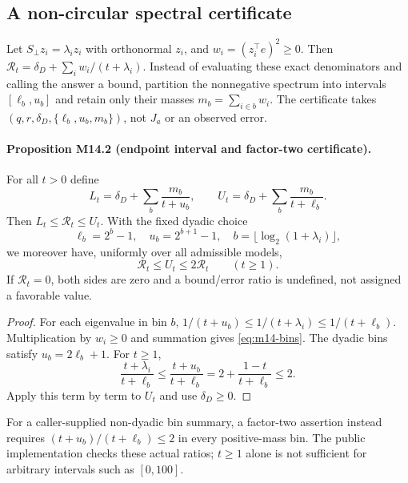 \subsection{A non-circular spectral certificate}
\label{subsec:m14-certificate}

Let $S_\perp z_i=\lambda_i z_i$ with orthonormal $z_i$, and
$w_i=(z_i^\top e)^2\geq0$.  Then
$\mathcal R_t=\delta_D+\sum_i w_i/(t+\lambda_i)$.
Instead of evaluating these exact denominators and calling the answer a
bound, partition the nonnegative spectrum into intervals
$[\ell_b,u_b]$ and retain only their masses
$m_b=\sum_{i\in b}w_i$.  The certificate takes
$(q,r,\delta_D,\{\ell_b,u_b,m_b\})$, not $J_a$ or an observed error.

\paragraph{Proposition M14.2 (endpoint interval and factor-two certificate).}
For all $t>0$ define
\begin{equation}
 L_t=\delta_D+\sum_b\frac{m_b}{t+u_b},\qquad
 U_t=\delta_D+\sum_b\frac{m_b}{t+\ell_b}.
 \label{eq:m14-bins}
\end{equation}
Then $L_t\leq\mathcal R_t\leq U_t$.  With the fixed dyadic choice
\begin{equation}
 \ell_b=2^b-1,\quad u_b=2^{b+1}-1,\quad
 b=\lfloor\log_2(1+\lambda_i)\rfloor,
 \label{eq:m14-dyadic}
\end{equation}
we moreover have, uniformly over all admissible models,
\begin{equation}
 \mathcal R_t\leq U_t\leq2\mathcal R_t\qquad (t\geq1).
 \label{eq:m14-factor-two}
\end{equation}
If $\mathcal R_t=0$, both sides are zero and a bound/error ratio is undefined,
not assigned a favorable value.

\begin{proof}
For each eigenvalue in bin $b$,
$1/(t+u_b)\leq1/(t+\lambda_i)\leq1/(t+\ell_b)$.
Multiplication by $w_i\geq0$ and summation gives
\eqref{eq:m14-bins}.  The dyadic bins satisfy
$u_b=2\ell_b+1$.  For $t\geq1$,
\[
 \frac{t+\lambda_i}{t+\ell_b}
 \leq\frac{t+u_b}{t+\ell_b}
 =2+\frac{1-t}{t+\ell_b}\leq2.
\]
Apply this term by term to $U_t$ and use $\delta_D\geq0$.
\end{proof}
For a caller-supplied non-dyadic bin summary, a factor-two assertion instead
requires $(t+u_b)/(t+\ell_b)\leq2$ in every positive-mass bin.  The public
implementation checks these actual ratios; $t\geq1$ alone is not sufficient
for arbitrary intervals such as $[0,100]$.

